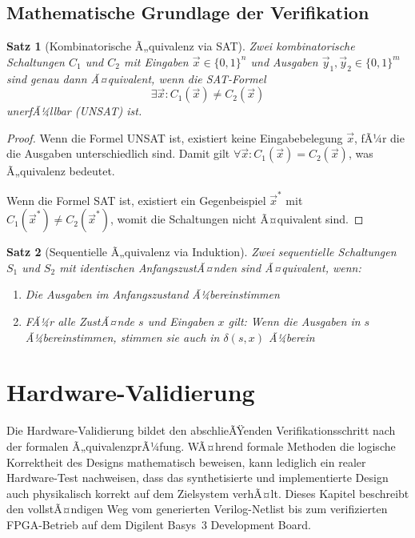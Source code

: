 ﻿\documentclass[12pt,a4paper]{report}
\newtheorem{theorem}{Satz}[section]
\begin{document}
\section{Mathematische Grundlage der Verifikation}

\begin{theorem}[Kombinatorische Ã„quivalenz via SAT]
Zwei kombinatorische Schaltungen $C_1$ und $C_2$ mit Eingaben $\vec{x} \in \{0,1\}^n$ und Ausgaben $\vec{y}_1, \vec{y}_2 \in \{0,1\}^m$ sind genau dann Ã¤quivalent, wenn die SAT-Formel
\[
\exists \vec{x} : C_1(\vec{x}) \neq C_2(\vec{x})
\]
unerfÃ¼llbar (UNSAT) ist.
\end{theorem}

\begin{proof}
Wenn die Formel UNSAT ist, existiert keine Eingabebelegung $\vec{x}$, fÃ¼r die die Ausgaben unterschiedlich sind. Damit gilt $\forall \vec{x} : C_1(\vec{x}) = C_2(\vec{x})$, was Ã„quivalenz bedeutet.

Wenn die Formel SAT ist, existiert ein Gegenbeispiel $\vec{x}^*$ mit $C_1(\vec{x}^*) \neq C_2(\vec{x}^*)$, womit die Schaltungen nicht Ã¤quivalent sind.
\end{proof}

\begin{theorem}[Sequentielle Ã„quivalenz via Induktion]
Zwei sequentielle Schaltungen $S_1$ und $S_2$ mit identischen AnfangszustÃ¤nden sind Ã¤quivalent, wenn:
\begin{enumerate}
    \item Die Ausgaben im Anfangszustand Ã¼bereinstimmen
    \item FÃ¼r alle ZustÃ¤nde $s$ und Eingaben $x$ gilt: Wenn die Ausgaben in $s$ Ã¼bereinstimmen, stimmen sie auch in $\delta(s, x)$ Ã¼berein
\end{enumerate}
\end{theorem}

\chapter{Hardware-Validierung}
\label{chap:hardware_validierung}

Die Hardware-Validierung bildet den abschlieÃŸenden Verifikationsschritt nach der formalen Ã„quivalenzprÃ¼fung. WÃ¤hrend formale Methoden die logische Korrektheit des Designs mathematisch beweisen, kann lediglich ein realer Hardware-Test nachweisen, dass das synthetisierte und implementierte Design auch physikalisch korrekt auf dem Zielsystem verhÃ¤lt. Dieses Kapitel beschreibt den vollstÃ¤ndigen Weg vom generierten Verilog-Netlist bis zum verifizierten FPGA-Betrieb auf dem Digilent Basys~3 Development Board.
\end{document}
